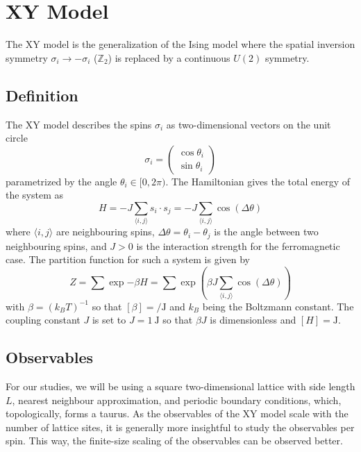 \section{XY Model}\label{sec:theo:xy_model}
	The XY model is the generalization of the Ising model where the spatial inversion symmetry $\sigma_i \rightarrow -\sigma_i$ ($\mathbb{Z}_2$) is replaced by a continuous $U(2)$ symmetry.
	
	\subsection{Definition}
		The XY model describes the spins $\sigma_i$ as two-dimensional vectors on the unit circle
		\begin{equation}\label{eq:hamiltonian}
			\sigma_i = \begin{pmatrix}
				\cos{\theta_i} \\ \sin{\theta_i}
			\end{pmatrix}
		\end{equation}
		parametrized by the angle $\theta_i \in [0,2\pi)$. The Hamiltonian gives the total energy of the system as
		\begin{equation}
			H = -J \sum_{\langle i, j \rangle}{s_i \cdot s_j} = -J \sum_{\langle i, j \rangle}{\cos(\Delta \theta)}
		\end{equation}
		where $\langle i,j \rangle$ are neighbouring spins, $\Delta \theta = \theta_i - \theta_j$ is the angle between two neighbouring spins, and $J>0$ is the interaction strength for the ferromagnetic case. The partition function for such a system is given by
		\begin{equation}
			Z = \sum{\exp{-\beta H}} = \sum{\exp{ \left( \beta J \sum_{\langle i, j \rangle}{\cos(\Delta \theta)} \right) }}
		\end{equation}
		with $\beta = (k_B T)^{-1}$ so that $[\beta] = \si{\per\joule}$ and $k_B$ being the Boltzmann constant. The coupling constant $J$ is set to $J = \SI{1}{\joule}$ so that $\beta J$ is dimensionless and $[H] = \si{\joule}$. 
		
	\subsection{Observables}
		For our studies, we will be using a square two-dimensional lattice with side length $L$, nearest neighbour approximation, and periodic boundary conditions, which, topologically, forms a taurus. As the observables of the XY model scale with the number of lattice sites, it is generally more insightful to study the observables per spin. This way, the finite-size scaling of the observables can be observed better.
	
